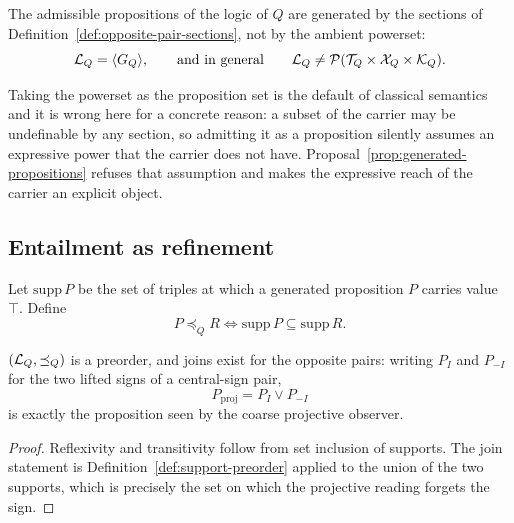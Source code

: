 \begin{proposal}\label{prop:generated-propositions}
The admissible propositions of the logic of $Q$ are generated by the sections of
Definition~\ref{def:opposite-pair-sections}, not by the ambient powerset:
\[
  \mathcal L_Q=\langle G_Q\rangle,\qquad\text{and in general}\qquad
  \mathcal L_Q\neq\mathcal P(\mathcal T_Q\times\mathcal X_Q\times\mathcal K_Q).
\]
\end{proposal}

\begin{remark}
Taking the powerset as the proposition set is the default of classical semantics and it is
wrong here for a concrete reason: a subset of the carrier may be undefinable by any
section, so admitting it as a proposition silently assumes an expressive power that the
carrier does not have.  Proposal~\ref{prop:generated-propositions} refuses that
assumption and makes the expressive reach of the carrier an explicit object.
\end{remark}

\subsection{Entailment as refinement}

\begin{definition}\label{def:support-preorder}
Let $\mathrm{supp}\,P$ be the set of triples at which a generated proposition $P$ carries
value $\top$.  Define
\[
  P\preceq_Q R \iff \mathrm{supp}\,P\subseteq \mathrm{supp}\,R .
\]
\end{definition}

\begin{proposition}\label{prop:refinement-preorder}
$(\mathcal L_Q,\preceq_Q)$ is a preorder, and joins exist for the opposite pairs: writing
$P_{I}$ and $P_{-I}$ for the two lifted signs of a central-sign pair,
\[
  P_{\mathrm{proj}}=P_{I}\vee P_{-I}
\]
is exactly the proposition seen by the coarse projective observer.
\end{proposition}

\begin{proof}
Reflexivity and transitivity follow from set inclusion of supports.  The join statement
is Definition~\ref{def:support-preorder} applied to the union of the two supports, which
is precisely the set on which the projective reading forgets the sign.
\end{proof}

